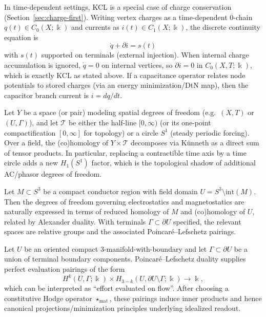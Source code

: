 \documentclass[11pt]{article}
\begin{document}
\begin{remark}\label{rem:charge-kcl}
In time-dependent settings, KCL is a special case of charge conservation (Section~\ref{sec:charge-first}).
Writing vertex charges as a time-dependent $0$-chain $q(t)\in C_0(X;\Bbbk)$ and currents as $i(t)\in C_1(X;\Bbbk)$, the discrete continuity equation is
\[
\dot q + \partial i = s(t)
\]
with $s(t)$ supported on terminals (external injection).
When internal charge accumulation is ignored, $\dot q=0$ on internal vertices, so $\partial i=0$ in $C_0(X,T;\Bbbk)$, which is exactly KCL as stated above.
If a capacitance operator relates node potentials to stored charges (via an energy minimization/DtN map), then the capacitor branch current is $i=dq/dt$.
\end{remark}

\begin{theorem}\label{thm:ac-kunneth}
Let $Y$ be a space (or pair) modeling spatial degrees of freedom (e.g.\ $(X,T)$ or $(U,\Gamma)$), and let $\mathcal{T}$ be either the half-line $[0,\infty)$ (or its one-point compactification $[0,\infty]$ for topology) or a circle $S^1$ (steady periodic forcing).
Over a field, the (co)homology of $Y\times \mathcal{T}$ decomposes via K\"unneth as a direct sum of tensor products.
In particular, replacing a contractible time axis by a time circle adds a new $H_1(S^1)$ factor, which is the topological shadow of additional AC/phasor degrees of freedom.
\end{theorem}

\begin{theorem}\label{thm:alexander-rlc}
Let $M\subset S^3$ be a compact conductor region with field domain $U=S^3\setminus \mathrm{int}(M)$.
Then the degrees of freedom governing electrostatics and magnetostatics are naturally expressed in terms of reduced homology of $M$ and (co)homology of $U$, related by Alexander duality.
With terminals $\Gamma\subset \partial U$ specified, the relevant spaces are relative groups and the associated Poincar\'e--Lefschetz pairings.
\end{theorem}

\begin{theorem}\label{thm:measurement-pairing}
Let $U$ be an oriented compact $3$-manifold-with-boundary and let $\Gamma\subset \partial U$ be a union of terminal boundary components.
Poincar\'e--Lefschetz duality supplies perfect evaluation pairings of the form
\[
H^k(U,\Gamma;\Bbbk)\times H_{3-k}(U,\partial U\setminus \Gamma;\Bbbk)\longrightarrow \Bbbk,
\]
which can be interpreted as ``effort evaluated on flow''.
After choosing a constitutive Hodge operator $\star_{\mathrm{mat}}$, these pairings induce inner products and hence canonical projections/minimization principles underlying idealized readout.
\end{theorem}
\end{document}
